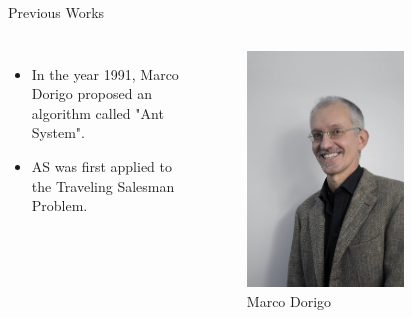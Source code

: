 \documentclass[table]{beamer}
\begin{document}
\begin{frame}{Previous Works}
	\begin{columns}
		\begin{itemize}
			\item In the year 1991, Marco Dorigo proposed an algorithm called "Ant System".
			
			
			\item  AS was first applied to the Traveling Salesman Problem.
			
			
		\end{itemize}
			\begin{figure}[h]
				\centering
				\includegraphics[width=0.7\textwidth]{Dorigo.jpg}
				\caption{Marco Dorigo}
			\end{figure}
	\end{columns}

	
	
\end{frame}
\end{document}
